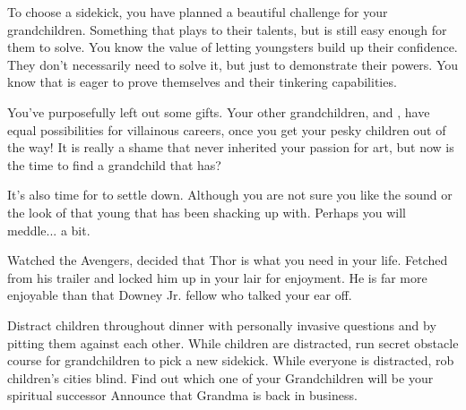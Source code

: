 \documentclass[char]{LRSguildcamp1}
\begin{document}
To choose a sidekick, you have planned a beautiful challenge for your grandchildren. Something that plays to their talents, but is still easy enough for them to solve. You know the value of letting youngsters build up their confidence. They don't necessarily need to solve it, but just to demonstrate their powers. You know that \cTeen{} is eager to prove themselves and their tinkering capabilities. 

You've purposefully left out some gifts. Your other grandchildren, \cGrad{} and \cTween{}, have equal possibilities for villainous careers, once you get your pesky children out of the way! It is really a shame that \cYoungest {} never inherited your passion for art, but now is the time to find a grandchild that has? 

It's also time for \cYoungest {} to settle down. Although you are not sure you like the sound or the look of that young \cYS{\hero} that \cYoungest{} has been shacking up with. Perhaps you will meddle... a bit. 

Watched the Avengers, decided that Thor is what you need in your life. Fetched \cChrisHemsworth{\intro} from his trailer and locked him up in your lair for enjoyment. He is far more enjoyable than that Downey Jr. fellow who talked your ear off. 

\begin{itemz}[Goals]
	\item 
	Distract children throughout dinner with personally invasive questions and by pitting them against each other. 
	While children are distracted, run secret obstacle course for grandchildren to pick a new sidekick. 
	While everyone is distracted, rob children’s cities blind. 
	Find out which one of your Grandchildren will be your spiritual successor 
	Announce that Grandma is back in business. 
	
\end{itemz}
\end{document}
